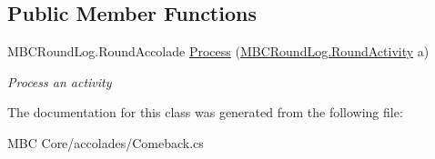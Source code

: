 \subsection*{Public Member Functions}
\begin{DoxyCompactItemize}
\item 
\hypertarget{class_m_b_c_core_1_1mbc_1_1accolades_1_1_comeback_a8a2df6ed0265633af99075c7bf59d75f}{M\-B\-C\-Round\-Log.\-Round\-Accolade \hyperlink{class_m_b_c_core_1_1mbc_1_1accolades_1_1_comeback_a8a2df6ed0265633af99075c7bf59d75f}{Process} (\hyperlink{class_m_b_c_core_1_1_m_b_c_round_log_1_1_round_activity}{M\-B\-C\-Round\-Log.\-Round\-Activity} a)}\label{class_m_b_c_core_1_1mbc_1_1accolades_1_1_comeback_a8a2df6ed0265633af99075c7bf59d75f}

\begin{DoxyCompactList}\small\item\em Process an activity\end{DoxyCompactList}\end{DoxyCompactItemize}


The documentation for this class was generated from the following file\-:\begin{DoxyCompactItemize}
\item 
M\-B\-C Core/accolades/Comeback.\-cs\end{DoxyCompactItemize}
